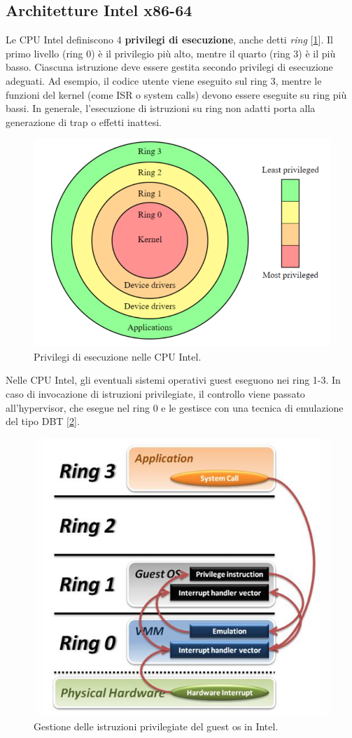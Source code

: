 \subsection{Architetture Intel x86-64}
Le CPU Intel definiscono 4 \textbf{privilegi di esecuzione}, anche detti \textit{ring} [\ref{fig:rings}]. Il primo livello (ring 0) è il privilegio più alto, mentre il quarto (ring 3) è il più basso. Ciascuna istruzione deve essere gestita secondo privilegi di esecuzione adeguati. Ad esempio, il codice utente viene eseguito sul ring 3, mentre le funzioni del kernel (come ISR o system calls) devono essere eseguite su ring più bassi. In generale, l'esecuzione di istruzioni su ring non adatti porta alla generazione di trap o effetti inattesi.
\begin{figure}[!h]
    \centering
    \includegraphics[width=0.5\linewidth]{img/rings.png}
    \caption{Privilegi di esecuzione nelle CPU Intel.}
    \label{fig:rings}
\end{figure}
Nelle CPU Intel, gli eventuali sistemi operativi guest eseguono nei ring 1-3. In caso di invocazione di istruzioni privilegiate, il controllo viene passato all'hypervisor, che esegue nel ring 0 e le gestisce con una tecnica di emulazione del tipo DBT [\ref{fig:intel-guestos}].
\begin{figure}[!h]
	\centering
	\includegraphics[width=0.45\linewidth]{img/intel-guestos}
	\caption{Gestione delle istruzioni privilegiate del guest os in Intel.}
	\label{fig:intel-guestos}
\end{figure}
